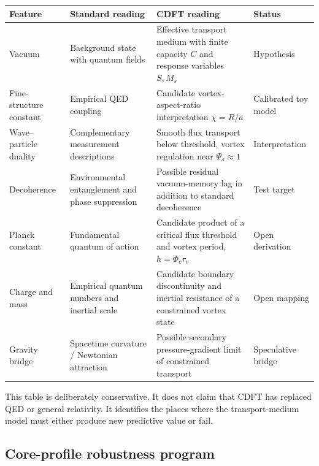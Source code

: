 \documentclass[11pt]{article}
\begin{document}
\begin{center}
\scriptsize
\begin{tabular}{p{}p{}p{}p{}}
\toprule
\textbf{Feature} & \textbf{Standard reading} & \textbf{CDFT reading} & \textbf{Status}\\
\midrule
Vacuum & Background state with quantum fields & Effective transport medium with finite capacity $C$ and response variables $S,M_s$ & Hypothesis\\
Fine-structure constant & Empirical QED coupling & Candidate vortex-aspect-ratio interpretation $\chi=R/a$ & Calibrated toy model\\
Wave--particle duality & Complementary measurement descriptions & Smooth flux transport below threshold, vortex regulation near $\Psi_s\approx1$ & Interpretation\\
Decoherence & Environmental entanglement and phase suppression & Possible residual vacuum-memory lag in addition to standard decoherence & Test target\\
Planck constant & Fundamental quantum of action & Candidate product of a critical flux threshold and vortex period, $h=\Phi_c\tau_v$ & Open derivation\\
Charge and mass & Empirical quantum numbers and inertial scale & Candidate boundary discontinuity and inertial resistance of a constrained vortex state & Open mapping\\
Gravity bridge & Spacetime curvature / Newtonian attraction & Possible secondary pressure-gradient limit of constrained transport & Speculative bridge\\
\bottomrule
\end{tabular}
\end{center}

This table is deliberately conservative. It does not claim that CDFT has
replaced QED or general relativity. It identifies the places where the
transport-medium model must either produce new predictive value or fail.

\subsection{Core-profile robustness program}
\end{document}
